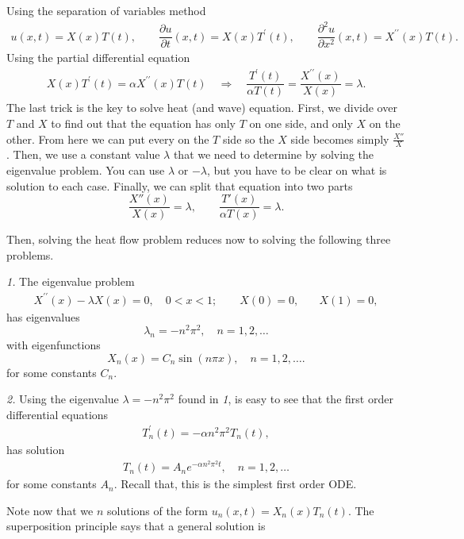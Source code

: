 \documentclass[11pt]{article}
\begin{document}
\begin{solution}
Using the separation of variables method
\begin{eqnarray*}
u(x,t) = X(x)T(t), \qquad
\dfrac{\partial u }{\partial t }(x,t) = X(x)T^{\prime}(t), \qquad
\dfrac{\partial^2 u}{\partial x^2}(x,t) = X^{\prime \prime}(x)T(t).
\end{eqnarray*}
Using the partial differential equation
\begin{eqnarray*}
X(x)T^{\prime}(t) = \alpha X^{\prime \prime}(x)T(t) \quad 
\Rightarrow \quad \dfrac{T^{\prime}(t)}{\alpha T(t)} = \dfrac{X^{\prime \prime}(x)}{X(x)} = \lambda.
\end{eqnarray*}
The last trick is the key to solve heat (and wave) equation. First, we divide over $T$ and $X$ to find out that the equation has only $T$ on one side, and only $X$ on the other. From here we can put every on the $T$ side so the $X$ side becomes simply $\frac{X''}{X}$. Then, we use a constant value $\lambda$ that we need to determine by solving the eigenvalue problem. You can use $\lambda$ or $-\lambda$, but you have to be clear on what is solution to each case. Finally, we can split that equation into two parts
\[\frac{X''(x)}{X(x)}=\lambda, \qquad \frac{T'(x)}{\alpha T(x)}=\lambda.\]

Then, solving the heat flow problem reduces now to solving the following three problems.

\textsl{1.} The eigenvalue problem
\begin{eqnarray*}
X^{\prime \prime}(x) - \lambda X(x) =0, \quad 0<x<1; \qquad
X(0)=0, \quad & X(1) =0,
\end{eqnarray*}
has eigenvalues $$\lambda_{n} = -n^2\pi^{2}, \quad n = 1,2 , \dots$$ with eigenfunctions $$\boxed{X_{n}(x) = C_{n} \sin(n\pi x)},\quad n = 1,2 , \dots.$$
for some constants $C_{n}$.


\textsl{2. } Using the eigenvalue $\lambda = -n^2\pi^{2}$ found in \textsl{1}, is easy to see that the first order differential equations
\begin{eqnarray*}
T_{n}^{\prime}(t) = - \alpha n^{2}\pi^{2} T_{n}(t),
\end{eqnarray*}
has solution
\begin{eqnarray*}
\boxed{T_{n}(t) = A_{n}e^{-\alpha n^{2}\pi^{2} t}},\quad n = 1,2 , \dots
\end{eqnarray*}
for some constants $A_{n}$. Recall that, this is the simplest first order ODE.

Note now that we $n$ solutions of the form $u_{n}(x,t)=X_{n}(x)T_{n}(t)$. The superposition principle says that a general solution is


\end{solution}
\end{document}

